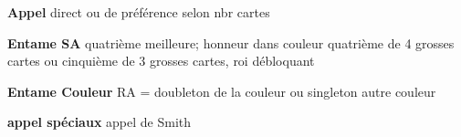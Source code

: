 \documentclass[twoside,a5paper]{article}
\newcommand{\g}[1]{\textbf{#1}}
\begin{document}
{\begin{multicols}{2}
	  
	  \g{Appel} \newline
	 direct ou de préférence selon nbr cartes
	 
	 
	 
	 \g{Entame SA} \newline
	quatrième meilleure; honneur dans couleur quatrième de 4 grosses cartes ou cinquième de 3 grosses cartes, roi débloquant


	\g{Entame Couleur} \newline
	RA = doubleton de la couleur ou singleton autre couleur


	\g{appel spéciaux} \newline
	appel de Smith

	
	\end{multicols}
}
\end{document}
